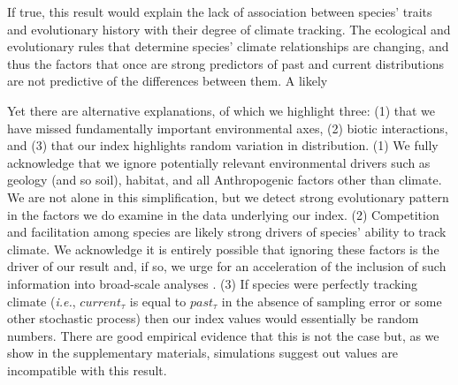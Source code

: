 \documentclass[12pt]{report}
\begin{document}
If true, this result would explain the lack of association between
species' traits and evolutionary history with their degree of climate
tracking. The ecological and evolutionary rules that determine
species' climate relationships are changing, and thus the factors that
once are strong predictors of past and current distributions are not
predictive of the differences between them. A likely 


Yet there are alternative
explanations, of which we highlight three: (1) that we have missed
fundamentally important environmental axes, (2) biotic interactions,
and (3) that our index highlights random variation in
distribution. (1) We fully acknowledge that we ignore potentially
relevant environmental drivers such as geology (and so soil), habitat,
and all Anthropogenic factors other than climate. We are not alone in
this simplification\supercite{xxx}, but we detect strong evolutionary
pattern in the factors we do examine in the data underlying our
index. (2) Competition and facilitation among species are likely
strong drivers of species' ability to track climate\supercite{xxx}. We
acknowledge it is entirely possible that ignoring these factors is the
driver of our result and, if so, we urge for an acceleration of the
inclusion of such information into broad-scale analyses
\supercite{xxx}. (3) If species were perfectly tracking climate
(\emph{i.e.}, $current_\tau$ is equal to $past_\tau$ in the absence of
sampling error or some other stochastic process) then our index values
would essentially be random numbers. There are good empirical evidence
that this is not the case \supercite{xxx} but, as we show in the
supplementary materials, simulations suggest out values are
incompatible with this result.
\end{document}
